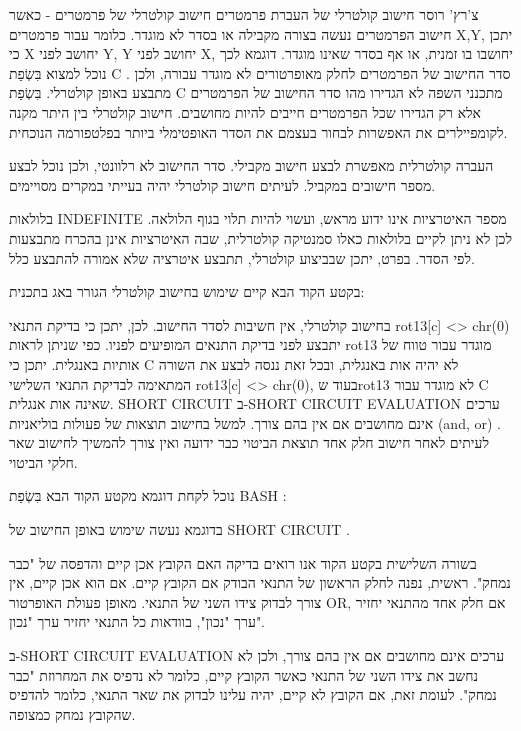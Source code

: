         צ'רץ' רוסר
        חישוב קולטרלי של העברת פרמטרים
        חישוב קולטרלי של פרמטרים - כאשר חישוב הפרמטרים נעשה בצורה מקבילה או בסדר לא מוגדר. כלומר עבור פרמטרים X,Y, יתכן כי X יחושב לפני Y, Y יחושב לפני X, יחושבו בו זמנית, או אף בסדר שאינו מוגדר. דוגמא לכך נוכל למצוא בִּשְׂפַת C . סדר החישוב של הפרמטרים לחלק מאופרטורים לא מוגדר עבורה, ולכן מתבצע באופן קולטרלי.
        בִּשְׂפַת C מתכנני השפה לא הגדירו מהו סדר החישוב של הפרמטרים אלא רק הגדירו שכל הפרמטרים חייבים להיות מחושבים. חישוב קולטרלי בין היתר מקנה לקומפיילרים את האפשרות לבחור בעצמם את הסדר האופטימלי ביותר בפלטפורמה הנוכחית.

        העברה קולטרלית מאפשרת לבצע חישוב מקבילי. סדר החישוב לא רלוונטי, ולכן נוכל לבצע מספר חישובים במקביל. לעיתים חישוב קולטרלי יהיה בעייתי במקרים מסויימים.

        בלולאות INDEFINITE מספר האיטרציות אינו ידוע מראש, ועשוי להיות תלוי בגוף הלולאה. לכן לא ניתן לקיים בלולאות כאלו סמנטיקה קולטרלית, שבה האיטרציות אינן בהכרח מתבצעות לפי הסדר. בפרט, יתכן שבביצוע קולטרלי, תתבצע איטרציה שלא אמורה להתבצע כלל.

        בקטע הקוד הבא קיים שימוש בחישוב קולטרלי הגורר באג בתכנית:

        בחישוב קולטרלי, אין חשיבות לסדר החישוב. לכן, יתכן כי בדיקת התנאי rot13[c] <> chr(0) יתבצע לפני בדיקת התנאים המופיעים לפניו. כפי שניתן לראות rot13 מוגדר עבור טווח של אותיות באנגלית. יתכן כי C לא יהיה אות באנגלית, ובכל זאת ננסה לבצע את השורה המתאימה לבדיקת התנאי השלישי rot13[c] <> chr(0), בעוד שrot13 לא מוגדר עבור C שאינה אות אנגלית.
        SHORT CIRCUIT
        ב-SHORT CIRCUIT EVALUATION ערכים אינם מחושבים אם אין בהם צורך. למשל בחישוב תוצאות של פעולות בוליאניות (and, or) .
        לעיתים לאחר חישוב חלק אחד תוצאת הביטוי כבר ידועה ואין צורך להמשיך לחישוב שאר חלקי הביטוי.

        נוכל לקחת דוגמא מקטע הקוד הבא בִּשְׂפַת BASH :

        בדוגמא נעשה שימוש באופן החישוב של SHORT CIRCUIT .

        בשורה השלישית בקטע הקוד אנו רואים בדיקה האם הקובץ אכן קיים והדפסה של "כבר
        נמחק". ראשית, נפנה לחלק הראשון של התנאי הבודק אם הקובץ קיים. אם הוא אכן קיים,
        אין צורך לבדוק צידו השני של התנאי. מאופן פעולת האופרטור OR, אם חלק אחד מהתנאי
        יחזיר ערך "נכון", בוודאות כל התנאי יחזיר ערך "נכון".

        ב-SHORT CIRCUIT EVALUATION ערכים אינם מחושבים אם אין בהם צורך, ולכן לא נחשב את
        צידו השני של התנאי כאשר הקובץ קיים, כלומר לא נדפיס את המחרוזת "כבר נמחק". לעומת
        זאת, אם הקובץ לא קיים, יהיה עלינו לבדוק את שאר התנאי, כלומר להדפיס שהקובץ נמחק
        כמצופה.

